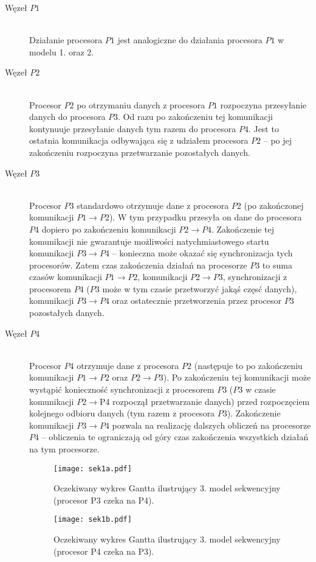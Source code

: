 \begin{description}

\item[Węzeł $P1$] \hfill \\

Działanie procesora $P1$ jest analogiczne do działania procesora $P1$ w modelu 1. oraz 2.

\item[Węzeł $P2$] \hfill \\

Procesor $P2$ po otrzymaniu danych z procesora $P1$ rozpoczyna przesyłanie danych do procesora $P3$. Od razu po zakończeniu tej komunikacji kontynuuje przesyłanie danych tym razem do procesora $P4$. Jest to ostatnia komunikacja odbywająca się z udziałem procesora $P2$ -- po jej zakończeniu rozpoczyna przetwarzanie pozostałych danych.

\item[Węzeł $P3$] \hfill \\

Procesor $P3$ standardowo otrzymuje dane z procesora $P2$ (po zakończonej komunikacji $P1 \to P2$). W tym przypadku przesyła on dane do procesora $P4$ dopiero po zakończeniu komunikacji $P2 \to P4$. Zakończenie tej komunikacji nie gwarantuje możliwości natychmiastowego startu komunikacji $P3 \to P4$ -- konieczna może okazać się synchronizacja tych procesorów. Zatem czas zakończenia działań na procesorze $P3$ to suma czasów komunikacji $P1 \to P2$, komunikacji $P2 \to P3$, synchronizacji z procesorem $P4$ ($P3$ może w tym czasie przetworzyć jakąś częsć danych), komunikacji $P3 \to P4$ oraz ostatecznie przetworzenia przez procesor $P3$ pozostałych danych.

\item[Węzeł $P4$] \hfill \\

Procesor $P4$ otrzymuje dane z procesora $P2$ (następuje to po zakończeniu komunikacji $P1 \to P2$ oraz $P2 \to P3$). Po zakończeniu tej komunikacji może wystąpić konieczność synchronizacji z procesorem $P3$ ($P3$ w czasie komunikacji $P2 \to $P4 rozpoczął przetwarzanie danych) przed rozpoczęciem kolejnego odbioru danych (tym razem z procesora $P3$). Zakończenie komunikacji $P3 \to P4$ pozwala na realizację dalszych obliczeń na procesorze $P4$ -- obliczenia te ograniczają od góry czas zakończenia wszystkich działań na tym procesorze.

\begin{figure}[H]
\centering
\texttt{[image: sek1a.pdf]}
\caption{Oczekiwany wykres Gantta ilustrujący 3. model sekwencyjny (procesor P3 czeka na P4).}
\label{fig:seq3a}
\end{figure}

\begin{figure}[H]
\centering
\texttt{[image: sek1b.pdf]}
\caption{Oczekiwany wykres Gantta ilustrujący 3. model sekwencyjny (procesor P4 czeka na P3).}
\label{fig:seq3b}
\end{figure}

\end{description}

